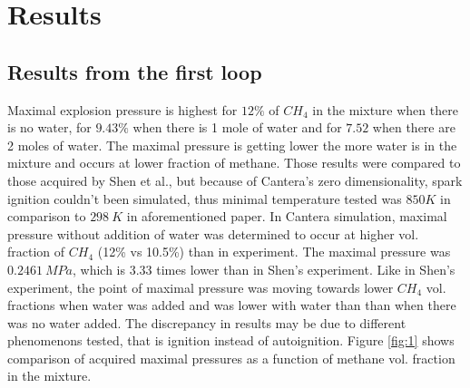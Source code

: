 \documentclass[a4paper]{article}
\begin{document}
\section{Results}
\subsection{Results from the first loop}
Maximal explosion pressure is highest for $12\%$ of $CH_4$ in the mixture when there is no water, for $9.43\%$ when there is 1 mole of water and for $7.52$ when there are 2 moles of water. The maximal pressure is getting lower the more water is in the mixture and occurs at lower fraction of methane.
Those results were compared to those acquired by Shen et al.\cite{shen2016explosion}, but because of Cantera's zero dimensionality, spark ignition couldn't been simulated, thus minimal temperature tested was $850 K$ in comparison to $298\ K$ in aforementioned paper.
In Cantera simulation, maximal pressure without addition of water was determined to occur at higher vol. fraction of $CH_4$ (12\% vs 10.5\%) than in experiment. The maximal pressure was $0.2461\ MPa$, which is 3.33 times lower than in Shen's experiment. Like in Shen's experiment, the point of maximal pressure was moving towards lower $CH_4$ vol. fractions when water was added and was lower with water than than when there was no water added.
The discrepancy in results may be due to different phenomenons tested, that is ignition instead of autoignition.
Figure \ref{fig:1} shows comparison of acquired maximal pressures as a function of methane vol. fraction in the mixture.
\end{document}
